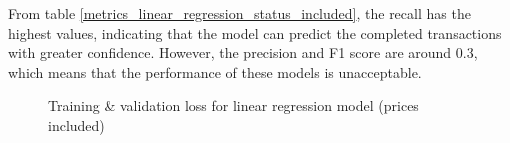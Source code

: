 \documentclass[12pt,twoside]{report}
\begin{document}
From table \ref{metrics_linear_regression_status_included}, the recall has the highest values, indicating that the model can predict the completed transactions with greater confidence. However, the precision and F1 score are around 0.3, which means that the performance of these models is unacceptable. 
\begin{figure}[!htbp]
	\centering
	\hfill
	\hfill
	\hfil
	\hfil
	\caption{Training \& validation loss for linear regression model (prices included)}
	\label{linear_regression_status_include_full}
\end{figure}
\end{document}
